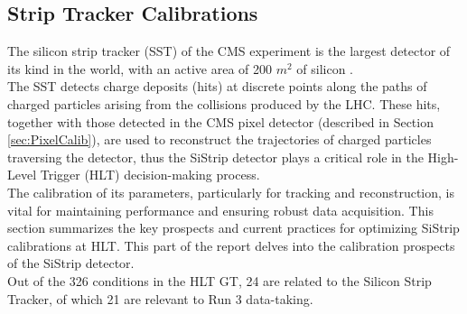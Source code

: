 \subsection{Strip Tracker Calibrations}

The silicon strip tracker (SST) of the CMS experiment is the largest detector of its kind in the world, with an active area of 200 $m^{2}$ of silicon \cite{Karimaki:368412,CERN-LHCC-2000-016,Adam_2021}.\\
The SST detects charge deposits (hits) at discrete points along the paths of charged particles arising from the collisions produced by the LHC. These hits, together with those detected in the CMS pixel detector (described in Section \ref{sec:PixelCalib}), are used to reconstruct the trajectories of charged particles traversing the detector, thus the SiStrip detector plays a critical role in the High-Level Trigger (HLT) decision-making process.\\
The calibration of its parameters, particularly for tracking and reconstruction, is vital for maintaining performance and ensuring robust data acquisition. This section summarizes the key prospects and current practices for optimizing SiStrip calibrations at HLT.\newline \newline
This part of the report delves into the calibration prospects of the SiStrip detector.\\
Out of the 326 conditions in the HLT GT, 24 are related to the Silicon Strip Tracker, of which 21 are relevant to Run 3 data-taking. 


